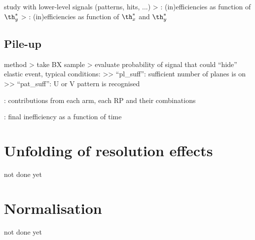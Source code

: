\> study with lower-level signals (patterns, hits, ...)
\>> : (in)efficiencies as function of $\th_y^*$
\>> : (in)efficiencies as function of $\th_x^*$ and $\th_y^*$




\iffalse
\> \plot{efficiencies/eff3outof4.pdf} : single RP inefficiencies WITHOUT the cut in $\th_x^*$

\> \plot{efficiencies/eff3outof4_2D.pdf} : single RP inefficiencies as function of $\th_x^*$ and $\th_y^*$
\>> clearly indicates the inefficiency due to the horizontal RPs
\>> vertical dashed lines show the $\th_x^*$ cut to select only region with reasonable efficiency

\> \plot{efficiencies/eff3outof4_afterCut.pdf} : single RP inefficiencies WITH the cut in $\th_x^*$
\>> red: with the $\th_x^*$ cut, green: without
\>> with cut: plateau flat
\fi

\subsection{Pile-up}

\> method
\>> take BX sample
\>> evaluate probability of signal that could ``hide'' elastic event, typical conditions:
\>>> ``pl\_suff'': sufficient number of planes is on
\>>> ``pat\_suff'': U or V pattern is recognised 

\> : contributions from each arm, each RP and their combinations

\> : final inefficiency as a function of time



\section{Unfolding of resolution effects}

\> not done yet



\section{Normalisation}

\> not done yet



